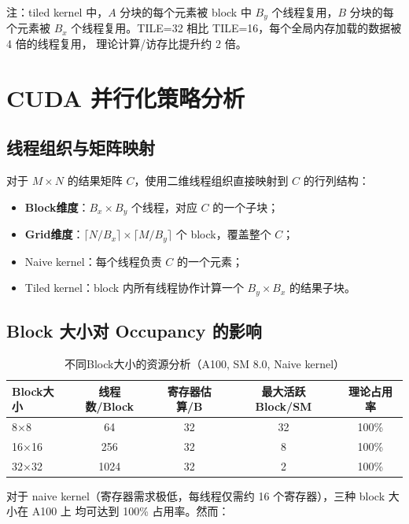 \documentclass[UTF8,a4paper,12pt,fontset=none]{ctexart}
\begin{document}
注：tiled kernel 中，$A$ 分块的每个元素被 block 中 $B_y$ 个线程复用，$B$ 分块的每个元素被 $B_x$
个线程复用。TILE=32 相比 TILE=16，每个全局内存加载的数据被 4 倍的线程复用，
理论计算/访存比提升约 2 倍。

\section{CUDA 并行化策略分析}

\subsection{线程组织与矩阵映射}

对于 $M \times N$ 的结果矩阵 $C$，使用二维线程组织直接映射到 $C$ 的行列结构：

\begin{itemize}
  \item \textbf{Block维度}：$B_x \times B_y$ 个线程，对应 $C$ 的一个子块；
  \item \textbf{Grid维度}：$\lceil N / B_x \rceil \times \lceil M / B_y \rceil$ 个 block，覆盖整个 $C$；
  \item Naive kernel：每个线程负责 $C$ 的一个元素；
  \item Tiled kernel：block 内所有线程协作计算一个 $B_y \times B_x$ 的结果子块。
\end{itemize}

\subsection{Block 大小对 Occupancy 的影响}

\begin{table}[H]
  \centering
  \caption{不同Block大小的资源分析（A100, SM 8.0, Naive kernel）}
  \label{tab:occupancy}
  \begin{tabular}{lcccc}
    \toprule
    Block大小 & 线程数/Block & 寄存器估算/B & 最大活跃Block/SM & 理论占用率 \\
    \midrule
    8×8   & 64   & 32 & 32 & 100\% \\
    16×16 & 256  & 32 & 8  & 100\% \\
    32×32 & 1024 & 32 & 2  & 100\% \\
    \bottomrule
  \end{tabular}
\end{table}

对于 naive kernel（寄存器需求极低，每线程仅需约 16 个寄存器），三种 block 大小在 A100 上
均可达到 100\% 占用率。然而：
\end{document}
